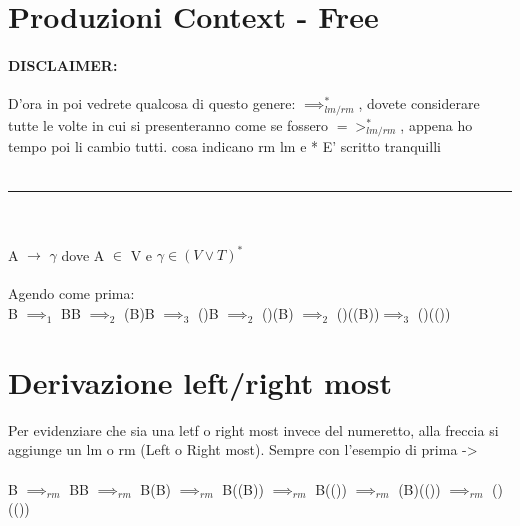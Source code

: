 \documentclass[12pt, a4paper, openany, oneside]{book}
\begin{document}
\section{Produzioni Context - Free}
\paragraph{DISCLAIMER: } D'ora in poi vedrete qualcosa di questo genere: 
$\implies^{*}_{lm/rm}$,
dovete considerare tutte le volte in cui si presenteranno come se fossero 
$=>^{*}_{lm/rm}$, appena ho tempo poi li cambio tutti. cosa indicano rm lm e *
E' scritto tranquilli \\
\\
{\color{black} \rule{\linewidth}{0.3mm} }
\\
\\
A $\to$ $\gamma$ dove A $\in$ V e $\gamma \in (V\vee T)^{*}$ \\ \\
Agendo come prima:	\\
B $\implies _{1}$ BB $\implies _{2}$ (B)B $\implies _{3}$ ()B $\implies _{2}$ 
()(B) $\implies _{2}$ ()((B))$\implies _{3}$ ()(())
\section{Derivazione left/right most}
Per evidenziare che sia una letf o right most invece del numeretto, alla freccia
si aggiunge un lm o rm (Left o Right most). Sempre con l'esempio di prima -> \\ \\
B $\implies _{rm}$ BB $\implies _{rm}$ B(B) $\implies _{rm}$ B((B)) 
$\implies _{rm}$ B(()) $\implies _{rm}$ (B)(()) $\implies _{rm}$ ()(())
\end{document}
